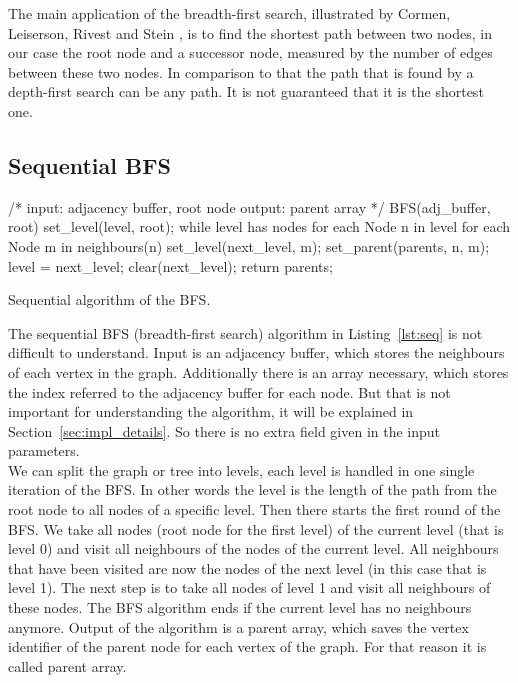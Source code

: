 \documentclass[12pt,a4paper]{article}
\begin{document}
The main application of the breadth-first search, illustrated by Cormen, Leiserson, Rivest and Stein \cite{cormen_introduction_2009}, is to find the shortest path between two nodes, in our case the root node and a successor node, measured by the number of edges between these two nodes. In comparison to that the path that is found by a depth-first search can be any path. It is not guaranteed that it is the shortest one.

\subsection{Sequential BFS}
\label{sec:sequential-bfs}

\begin{listing}[h]
\begin{ccode}
/*
input: adjacency buffer, root node
output: parent array
*/
BFS(adj_buffer, root){
	set_level(level, root);
	while level has nodes {
		for each Node n in level {
			for each Node m in neighbours(n){
				set_level(next_level, m);
				set_parent(parents, n, m);
			}
		}
		level = next_level;
		clear(next_level);
	}
	return parents;
}
\end{ccode}
\caption{Sequential algorithm of the BFS.}
\label{lst:seq}
\end{listing}

The sequential BFS (breadth-first search) algorithm in Listing~\ref{lst:seq} is not difficult to understand. Input is an adjacency buffer, which stores the neighbours of each vertex in the graph. Additionally there is an array necessary, which stores the index referred to the adjacency buffer for each node. But that is not important for understanding the algorithm, it will be explained in Section~\ref{sec:impl_details}. So there is no extra field given in the input parameters. \\
We can split the graph or tree into levels, each level is handled in one single iteration of the BFS. In other words the level is the length of the path from the root node to all nodes of a specific level.
Then there starts the first round of the BFS. We take all nodes (root node for the first level) of the current level (that is level 0) and visit all neighbours of the nodes of the current level. All neighbours that have been visited are now the nodes of the next level (in this case that is level 1). The next step is to take all nodes of level 1 and visit all neighbours of these nodes. The BFS algorithm ends if the current level has no neighbours anymore. Output of the algorithm is a parent array, which saves the vertex identifier of the parent node for each vertex of the graph. For that reason it is called parent array.
\end{document}
